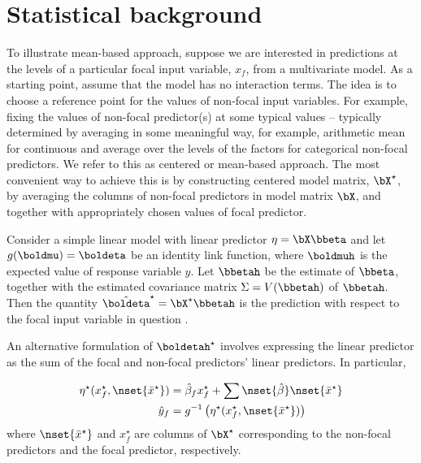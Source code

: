 \section{Statistical background}


To illustrate mean-based approach, suppose we are interested in predictions at the levels of a particular focal input variable, $x_f$, from a multivariate model. As a starting point, assume that the model has no interaction terms. The idea is to choose a reference point for the values of non-focal input variables. For example, fixing the values of non-focal predictor(s) at some typical values -- typically determined by averaging in some meaningful way, for example, arithmetic mean  for continuous and average over the levels of the factors for categorical non-focal predictors. We refer to this as centered or mean-based approach. The most convenient way to achieve this is by constructing centered model matrix, $\bX^\star$, by averaging the columns of non-focal predictors in model matrix $\bX$, and together with appropriately chosen values of focal predictor.

Consider a simple linear model with linear predictor $\eta = \bX\bbeta$ and let $g(\boldmu) = \boldeta$ be an identity link function, where $\boldmuh$ is the expected value of response variable $\hat{y}$. Let $\bbetah$ be the estimate of $\bbeta$, together with the estimated covariance matrix $\Sigma = V(\bbetah)$ of $\bbetah$. Then the quantity $\hat{\boldeta}^\star = \bX^\star\bbetah$ is the prediction with respect to the focal input variable in question \citep{fox2009effect}.

An alternative formulation of $\boldetah^\star$ involves expressing the linear predictor as the sum of the focal and non-focal predictors' linear predictors. In particular, 

\begin{align}\label{eq:eta_mean}
\eta^\star(x^\star_f, \nset{{\bar{x}^\star}}) &= \hat{\beta}_f x^\star_f + \sum \nset{\hat{\beta}} \nset{{\bar{x}^\star}} \\
\hat{y}_f  &= g^{-1} \left(\eta^\star(x^\star_f, \nset{{\bar{x}^\star}})\right)
\end{align}
where $\nset{{\bar{x}^\star}}$ and $x^\star_f$ are columns of $\bX^\star$ corresponding to the non-focal predictors and the focal predictor, respectively.


